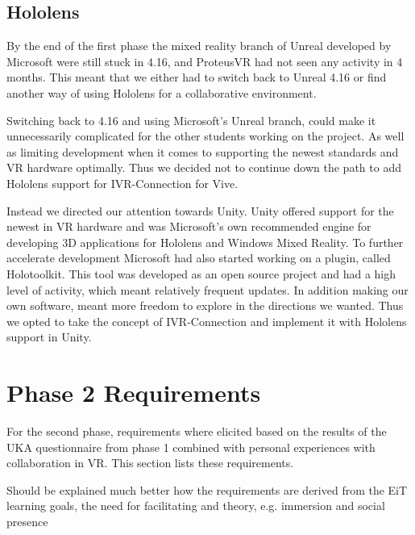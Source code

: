         
        \subsection{Hololens} %
        By the end of the first phase the mixed reality branch of Unreal developed by Microsoft were still stuck in 4.16, and ProteusVR had not seen any activity in 4 months. This meant that we either had to switch back to Unreal 4.16 or find another way of using Hololens for a collaborative environment.
        
        Switching back to 4.16 and using Microsoft's Unreal branch, could make it unnecessarily complicated for the other students working on the project. As well as limiting development when it comes to supporting the newest standards and VR hardware optimally. Thus we decided not to continue down the path to add Hololens support for IVR-Connection for Vive.
        
        Instead we directed our attention towards Unity. Unity offered support for the newest in VR hardware and was Microsoft's own recommended engine for developing 3D applications for Hololens and Windows Mixed Reality. To further accelerate development Microsoft had also started working on a plugin, called Holotoolkit. This tool was developed as an open source project and had a high level of activity, which meant relatively frequent updates. In addition making our own software, meant more freedom to explore in the directions we wanted. Thus we opted to take the concept of IVR-Connection and implement it with Hololens support in Unity. %
        
    \section{Phase 2 Requirements}
    For the second phase, requirements where elicited based on the results of the UKA questionnaire from phase 1 combined with personal experiences with collaboration in VR. This section lists these requirements.
    
    Should be explained much better how the requirements are derived from the EiT learning goals, the need for facilitating and theory, e.g. immersion and social presence
    
